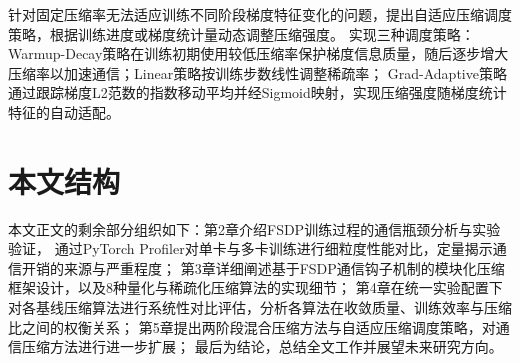 针对固定压缩率无法适应训练不同阶段梯度特征变化的问题，提出自适应压缩调度策略，根据训练进度或梯度统计量动态调整压缩强度。
实现三种调度策略：Warmup-Decay策略在训练初期使用较低压缩率保护梯度信息质量，随后逐步增大压缩率以加速通信；Linear策略按训练步数线性调整稀疏率；
Grad-Adaptive策略通过跟踪梯度L2范数的指数移动平均并经Sigmoid映射，实现压缩强度随梯度统计特征的自动适配。

\section{本文结构}

本文正文的剩余部分组织如下：第2章介绍FSDP训练过程的通信瓶颈分析与实验验证，
通过PyTorch Profiler对单卡与多卡训练进行细粒度性能对比，定量揭示通信开销的来源与严重程度；
第3章详细阐述基于FSDP通信钩子机制的模块化压缩框架设计，以及8种量化与稀疏化压缩算法的实现细节；
第4章在统一实验配置下对各基线压缩算法进行系统性对比评估，分析各算法在收敛质量、训练效率与压缩比之间的权衡关系；
第5章提出两阶段混合压缩方法与自适应压缩调度策略，对通信压缩方法进行进一步扩展；
最后为结论，总结全文工作并展望未来研究方向。
